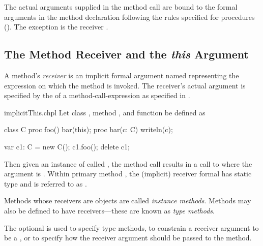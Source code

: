 The actual arguments supplied in the method call are bound to the
formal arguments in the method declaration following the rules specified for
procedures (). The exception is the receiver
.

\subsection{The Method Receiver and the {\em this} Argument}
\label{The_em_this_Reference}

A method's \emph{receiver} is an implicit formal argument
named  representing the expression on which the method is
invoked.  The receiver's actual argument is specified by the
 of a method-call-expression as specified
in .  




\begin{chapelexample}{implicitThis.chpl}
Let class , method , and function  be
defined as
\begin{chapel}
class C {
  proc foo() {
    bar(this);
  }
}
proc bar(c: C) { writeln(c); }
\end{chapel}
\begin{chapelpost}
var c1: C = new C();
c1.foo();
delete c1;
\end{chapelpost}
\begin{chapeloutput}
{}
\end{chapeloutput}
Then given an instance of  called , the method
call  results in a call to  where the
argument is .  Within primary method , the
(implicit) receiver formal has static type  and is referred to
as .
\end{chapelexample}

Methods whose receivers are objects are called \emph{instance
methods}.  Methods may also be defined to have 
receivers---these are known as \emph{type methods}.

The optional  is used to specify type methods, to
constrain a receiver argument to be a , or to specify how
the receiver argument should be passed to the method.

